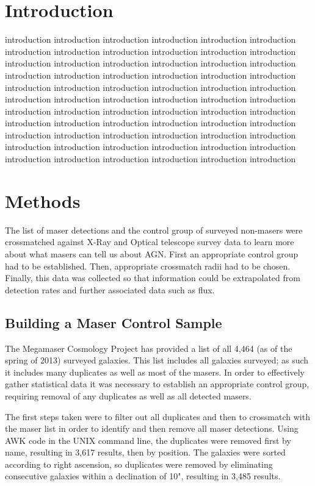 \documentclass[10pt]{article}
\begin{document}
\begin{multicols}{2}
\section{Introduction}
introduction introduction introduction introduction introduction introduction introduction introduction introduction introduction introduction introduction introduction introduction introduction introduction introduction introduction introduction introduction introduction introduction introduction introduction introduction introduction introduction introduction introduction introduction introduction introduction introduction introduction introduction introduction introduction introduction introduction introduction introduction introduction introduction introduction 
introduction introduction introduction introduction introduction introduction introduction introduction introduction introduction introduction introduction introduction introduction introduction introduction introduction introduction introduction introduction introduction introduction 
\section{Methods}\label{methods}
The list of maser detections and the control group of surveyed non-masers were crossmatched against X-Ray and Optical telescope survey data to learn more about what masers can tell us about AGN. First an appropriate control group had to be established. Then, appropriate crossmatch radii had to be chosen. Finally, this data was collected so that information could be extrapolated from detection rates and further associated data such as flux.

\subsection{Building a Maser Control Sample}\label{control}
The Megamaser Cosmology Project has provided a list of all 4,464 (as of the spring of 2013) surveyed galaxies\cite{surv}. This list includes all galaxies surveyed; as such it includes many duplicates as well as most of the masers. In order to effectively gather statistical data it was necessary to establish an appropriate control group, requiring removal of any duplicates as well as all detected masers.

The first steps taken were to filter out all duplicates and then to crossmatch with the maser list in order to identify and then remove all maser detections. Using AWK code in the UNIX command line, the duplicates were removed first by name, resulting in 3,617 results, then by position. The galaxies were sorted according to right ascension, so duplicates were removed by eliminating consecutive galaxies within a declination of 10", resulting in 3,485 results.


\end{multicols}
\end{document}

